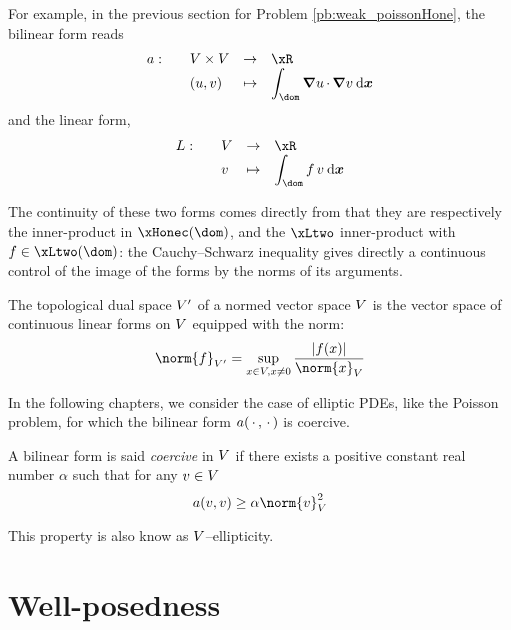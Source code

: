 \medskip
For example, in the previous section for Problem \eqref{pb:weak_poissonHone}, the bilinear form reads
\begin{equation*}
\begin{array}{llll}
a:\quad& \xV\times \xV &\rightarrow& \xR \\
\hfill & (u,v)     &\mapsto    & \displaystyle\int_\dom \Grad u \xDot \Grad v \dx
\end{array}
\end{equation*}
and the linear form,
\begin{equation*}
\begin{array}{llll}
L:\quad& \xV &\rightarrow& \xR \\
\hfill &   v &\mapsto    & \displaystyle\int_\dom f\,v \dx
\end{array}
\end{equation*}

The continuity of these two forms comes directly from that they are respectively the inner-product in $\xHonec(\dom)$, and the $\xLtwo$ inner-product with $f \in \xLtwo(\dom)$: the Cauchy--Schwarz inequality gives directly a continuous control of the image of the forms by the norms of its arguments.

\medskip
\begin{dfntn}
The topological dual space ${V}'$ of a normed vector space ${V}$ is the vector space of continuous linear forms on ${V}$ equipped with the norm:
\begin{equation*}
\norm{f}_{\xV'} = \sup_{x \in \xV, x \neq 0} \dfrac{|f(x)|}{\norm{x}_\xV}
\end{equation*}
\end{dfntn}

\medskip

In the following chapters, we consider the case of elliptic PDEs, like the Poisson problem, for which the bilinear form $a(\,{\mathbf\cdot}\,,\,{\mathbf\cdot}\,)$ is coercive.
\begin{prpstn}[Coercivity]
A bilinear form is said \textit{coercive} in ${V}$ if there exists a positive constant real number $\alpha$ such that for any $v \in {V}$
\begin{equation*}
a( v, v ) \geq \alpha \norm{v}^2_\xV
\end{equation*}
\end{prpstn}
This property is also know as ${V}$--ellipticity.

\section{Well-posedness}

